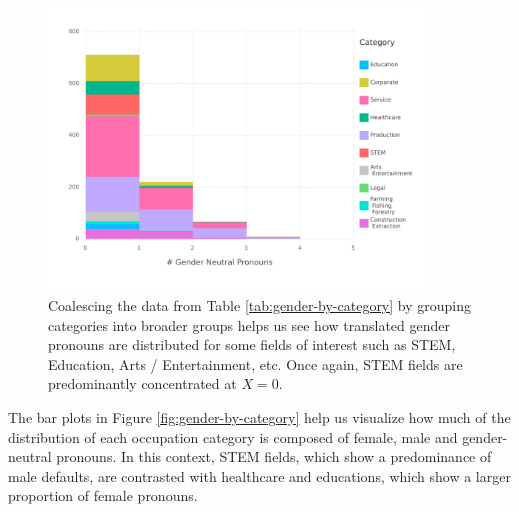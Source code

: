 \documentclass[fleqn,10pt]{article}
\begin{document}
\begin{figure}[H]
	\centering
	\includegraphics[width=10cm]{pictures/histogram-neutral-grouped}
	\caption{Coalescing the data from Table \ref{tab:gender-by-category} by grouping categories into broader groups helps us see how translated gender pronouns are distributed for some fields of interest such as STEM, Education, Arts / Entertainment, etc. Once again, STEM fields are predominantly concentrated at $X = 0$.}
	\label{fig:histogram-neutral-grouped}
\end{figure}

The bar plots in Figure \ref{fig:gender-by-category} help us visualize how much of the distribution of each occupation category is composed of female, male and gender-neutral pronouns. In this context, STEM fields, which show a predominance of male defaults, are contrasted with healthcare and educations, which show a larger proportion of female pronouns.
\end{document}
